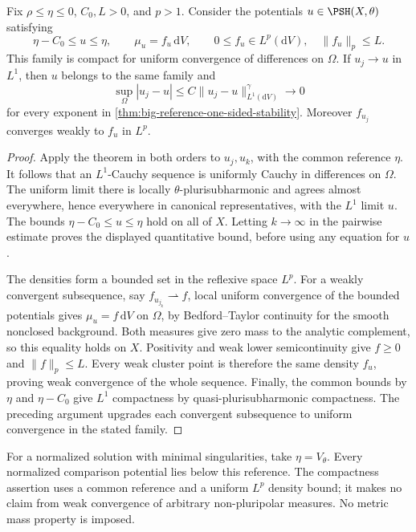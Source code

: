 \begin{corollary}\label{cor:big-reference-uniform-convergence}
Fix $\rho\leq\eta\leq0$, $C_0,L>0$, and $p>1$. Consider the potentials
$u\in\PSH(X,\theta)$ satisfying
\[
 \eta-C_0\leq u\leq\eta,\qquad
 \mu_u=f_u\,\mathrm{d}V,\qquad0\leq f_u\in L^p(\mathrm{d}V),
 \quad\|f_u\|_p\leq L.
\]
This family is compact for uniform convergence of differences on $\Omega$.
If $u_j\to u$ in $L^1$, then $u$ belongs to the same family and
\[
 \sup_\Omega|u_j-u|\leq C\|u_j-u\|_{L^1(\mathrm{d}V)}^\gamma
 \longrightarrow0
\]
for every exponent in \cref{thm:big-reference-one-sided-stability}.
Moreover $f_{u_j}$ converges weakly to $f_u$ in $L^p$.
\end{corollary}
\begin{proof}
Apply the theorem in both orders to $u_j,u_k$, with the common reference
$\eta$. It follows that an $L^1$-Cauchy sequence is uniformly Cauchy in
differences on $\Omega$. The uniform limit there is locally
$\theta$-plurisubharmonic and agrees almost everywhere, hence everywhere
in canonical representatives, with the $L^1$ limit $u$. The bounds
$\eta-C_0\leq u\leq\eta$ hold on all of $X$. Letting $k\to\infty$ in
the pairwise estimate proves the displayed quantitative bound, before
using any equation for $u$.

The densities form a bounded set in the reflexive space $L^p$. For a
weakly convergent subsequence, say $f_{u_{j_k}}\rightharpoonup f$, local
uniform convergence of the bounded potentials gives
$\mu_u=f\,\mathrm{d}V$ on $\Omega$, by Bedford--Taylor continuity for
the smooth nonclosed background. Both measures give zero mass to the
analytic complement, so this equality holds on $X$. Positivity and
weak lower semicontinuity give $f\geq0$ and $\|f\|_p\leq L$.
Every weak cluster point is therefore the same density $f_u$, proving
weak convergence of the whole sequence. Finally, the common bounds by
$\eta$ and $\eta-C_0$ give $L^1$ compactness by quasi-plurisubharmonic
compactness. The preceding argument upgrades each convergent subsequence
to uniform convergence in the stated family.
\end{proof}

For a normalized solution with minimal singularities, take
$\eta=V_\theta$. Every normalized comparison potential lies below this
reference. The compactness assertion uses a common reference and a
uniform $L^p$ density bound; it makes no claim from weak convergence of
arbitrary non-pluripolar measures. No metric mass property is imposed.

